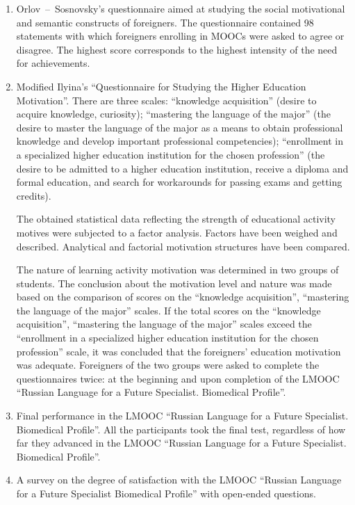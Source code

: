 \documentclass[english]{textolivre}
\begin{document}
\begin{enumerate}
    \item Orlov – Sosnovsky’s questionnaire aimed at studying the social motivational and semantic constructs of foreigners. The questionnaire contained 98 statements with which foreigners enrolling in MOOCs were asked to agree or disagree. The highest score corresponds to the highest intensity of the need for achievements.
    \item Modified Ilyina’s “Questionnaire for Studying the Higher Education Motivation”. There are three scales: “knowledge acquisition” (desire to acquire knowledge, curiosity); “mastering the language of the major” (the desire to master the language of the major as a means to obtain professional knowledge and develop important professional competencies); “enrollment in a specialized higher education institution for the chosen profession” (the desire to be admitted to a higher education institution, receive a diploma and formal education, and search for workarounds for passing exams and getting credits).

The obtained statistical data reflecting the strength of educational activity motives were subjected to a factor analysis. Factors have been weighed and described. Analytical and factorial motivation structures have been compared.

The nature of learning activity motivation was determined in two groups of students. The conclusion about the motivation level and nature was made based on the comparison of scores on the “knowledge acquisition”, “mastering the language of the major” scales. If the total scores on the “knowledge acquisition”, “mastering the language of the major” scales exceed the “enrollment in a specialized higher education institution for the chosen profession” scale, it was concluded that the foreigners’ education motivation was adequate. Foreigners of the two groups were asked to complete the questionnaires twice: at the beginning and upon completion of the LMOOC “Russian Language for a Future Specialist. Biomedical Profile”.

\item Final performance in the LMOOC “Russian Language for a Future Specialist. Biomedical Profile”. All the participants took the final test, regardless of how far they advanced in the LMOOC “Russian Language for a Future Specialist. Biomedical Profile”.

\item A survey on the degree of satisfaction with the LMOOC “Russian Language for a Future Specialist Biomedical Profile” with open-ended questions.
\end{enumerate}
\end{document}
